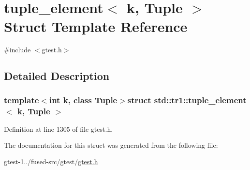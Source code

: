\hypertarget{structstd_1_1tr1_1_1tuple__element}{\section{tuple\-\_\-element$<$ k, \-Tuple $>$ \-Struct \-Template \-Reference}
\label{d4/d4b/structstd_1_1tr1_1_1tuple__element}
}


{\ttfamily \#include $<$gtest.\-h$>$}



\subsection{\-Detailed \-Description}
\subsubsection*{template$<$int k, class Tuple$>$struct std\-::tr1\-::tuple\-\_\-element$<$ k, Tuple $>$}



\-Definition at line 1305 of file gtest.\-h.



\-The documentation for this struct was generated from the following file\-:\begin{DoxyCompactItemize}
\item 
gtest-\/1../fused-\/src/gtest/\hyperlink{fused-src_2gtest_2gtest_8h}{gtest.\-h}\end{DoxyCompactItemize}
